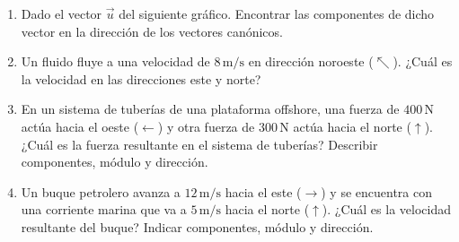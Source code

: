 \begin{enumerate}[\hspace{-3mm}$1)$]
\item Dado el vector $\vec u$ del siguiente gráfico. Encontrar las componentes de dicho vector en la dirección de los vectores canónicos.


\item Un fluido fluye a una velocidad de $8\,\text{m/s}$ en dirección noroeste ($\nwarrow$). ¿Cuál es la velocidad en las direcciones este y norte?

\item En un sistema de tuberías de una plataforma offshore, una fuerza de $400\,\text{N}$ actúa hacia el oeste ($\leftarrow$) y otra fuerza de $300\,\text{N}$ actúa hacia el norte ($\uparrow$). ¿Cuál es la fuerza resultante en el sistema de tuberías? Describir componentes, módulo y dirección.

\item Un buque petrolero avanza a $12\,\text{m/s}$ hacia el este ($\rightarrow$) y se encuentra con una corriente marina que va a $5\,\text{m/s}$ hacia el norte ($\uparrow$). ¿Cuál es la velocidad resultante del buque? Indicar componentes, módulo y dirección.


\end{enumerate}
